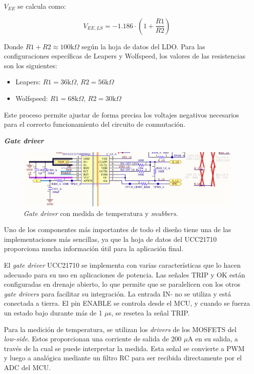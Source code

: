 $V_{EE}$ se calcula como:

\[ V_{EE,LS} = -1.186 \cdot \left(1 + \frac{R1}{R2}\right) \]

Donde \( R1 + R2 \approx 100 \text{k}\Omega \) según la hoja de datos del LDO. Para las configuraciones específicas de Leapers y Wolfspeed, los valores de las resistencias son los siguientes:

\begin{itemize}
	\item Leapers: \( R1 = 36 \text{k}\Omega \), \( R2 = 56 \text{k}\Omega \)
	\item Wolfspeed: \( R1 = 68 \text{k}\Omega \), \( R2 = 30 \text{k}\Omega \)
\end{itemize}

Este proceso permite ajustar de forma precisa los voltajes negativos necesarios para el correcto funcionamiento del circuito de conmutación.


\textbf{\textit{Gate driver}}
\begin{figure}[H]
	\centering
	\includegraphics[width=0.9\linewidth]{fig/GD-sch}
	\caption{\textit{Gate driver} con medida de temperatura y \textit{snubbers}.}
\end{figure}

Uno de los componentes más importantes de todo el diseño tiene una de las implementaciones más sencillas, ya que la hoja de datos del UCC21710 proporciona mucha información útil para la aplicación final.

El \textit{gate driver} UCC21710 se implementa con varias características que lo hacen adecuado para su uso en aplicaciones de potencia. Las señales TRIP y OK están configuradas en drenaje abierto, lo que permite que se paralelicen con los otros \textit{gate drivers} para facilitar su integración. La entrada IN- no se utiliza y está conectada a tierra. El pin ENABLE se controla desde el MCU, y cuando se fuerza un estado bajo durante más de 1 $\mu$s, se resetea la señal TRIP.

Para la medición de temperatura, se utilizan los \textit{drivers} de los MOSFETS del \textit{low-side}. Estos proporcionan una corriente de salida de 200 $\mu$A en su salida, a través de la cual se puede interpretar la medida. Esta señal se convierte a PWM y luego a analógica mediante un filtro RC para ser recibida directamente por el ADC del MCU. 

